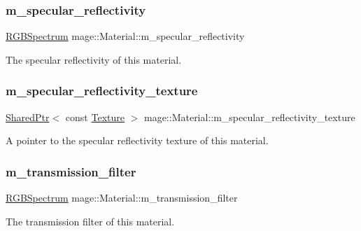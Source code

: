 \subsubsection{\texorpdfstring{m\+\_\+specular\+\_\+reflectivity}{m\_specular\_reflectivity}}
{\footnotesize\ttfamily \hyperlink{structmage_1_1_r_g_b_spectrum}{R\+G\+B\+Spectrum} mage\+::\+Material\+::m\+\_\+specular\+\_\+reflectivity\hspace{0.3cm}{\ttfamily [private]}}

The specular reflectivity of this material. \hypertarget{structmage_1_1_material_ad9ff13c552aaa97de98828cb15d16e18}{}\label{structmage_1_1_material_ad9ff13c552aaa97de98828cb15d16e18} 
\subsubsection{\texorpdfstring{m\+\_\+specular\+\_\+reflectivity\+\_\+texture}{m\_specular\_reflectivity\_texture}}
{\footnotesize\ttfamily \hyperlink{namespacemage_a1e01ae66713838a7a67d30e44c67703e}{Shared\+Ptr}$<$ const \hyperlink{classmage_1_1_texture}{Texture} $>$ mage\+::\+Material\+::m\+\_\+specular\+\_\+reflectivity\+\_\+texture\hspace{0.3cm}{\ttfamily [private]}}

A pointer to the specular reflectivity texture of this material. \hypertarget{structmage_1_1_material_a9573a0d2a5fb0322f9eb103ace34dd47}{}\label{structmage_1_1_material_a9573a0d2a5fb0322f9eb103ace34dd47} 
\subsubsection{\texorpdfstring{m\+\_\+transmission\+\_\+filter}{m\_transmission\_filter}}
{\footnotesize\ttfamily \hyperlink{structmage_1_1_r_g_b_spectrum}{R\+G\+B\+Spectrum} mage\+::\+Material\+::m\+\_\+transmission\+\_\+filter\hspace{0.3cm}{\ttfamily [private]}}

The transmission filter of this material.

